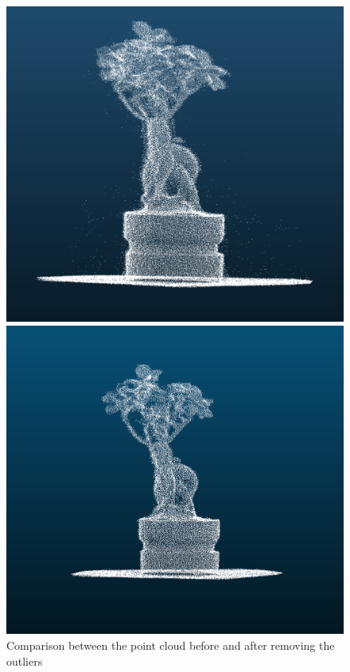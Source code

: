 \documentclass[runningheads,a4paper]{llncs}
\begin{document}
\begin{figure}
\begin{minipage}{.5\textwidth}
  \includegraphics[width=0.9\linewidth]{complex-tree-sample.png}
\end{minipage}
\begin{minipage}{.5\textwidth}
  \centering
  \includegraphics[width=0.9\linewidth]{after-filter.PNG}
\end{minipage}
\caption{Comparison between the point cloud before and after removing the outliers}
\label{fig:fiiter-comparison}
\end{figure}
\end{document}
